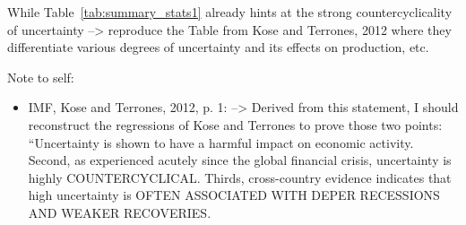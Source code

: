 \documentclass[a4paper,11pt,listof=nochaptergap,oneside,pointednumbers,bibtotoc,bigheadings,liststotoc]{scrbook}
\begin{document}
While Table~\ref{tab:summary_stats1} already hints at the strong countercyclicality of uncertainty --> reproduce the Table from Kose and Terrones, 2012 where they differentiate various degrees of uncertainty and its effects on production, etc.


\begingroup
    \fontsize{8pt}{12pt}\selectfont
    Note to self:
\begin{itemize}
	\item IMF, Kose and Terrones, 2012, p. 1: --> Derived from this statement, I should reconstruct the regressions of Kose and Terrones to prove those two points: ``Uncertainty is shown to have a harmful impact on economic activity. Second, as experienced acutely since the global financial crisis, uncertainty is highly COUNTERCYCLICAL. Thirds, cross-country evidence indicates that high uncertainty is OFTEN ASSOCIATED WITH DEPER RECESSIONS AND WEAKER RECOVERIES. 
\end{itemize}
\endgroup
\end{document}
